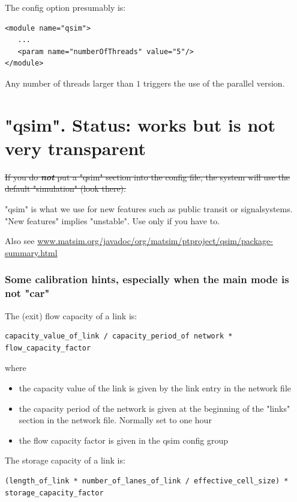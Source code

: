 The config option presumably is:
\begin{verbatim}
<module name="qsim">
   ...
   <param name="numberOfThreads" value="5"/>
</module>

\end{verbatim}

Any number of threads larger than $1$ triggers the use of the parallel version.

\vfill\eject
\section{"qsim". Status: works but is not very transparent}

\sout{If you do \textbf{\emph{not}} put a "qsim" section into the config file, the system will use the default "simulation" (look there).}

"qsim"  is what we use for new features such as public transit or  signalsystems. "New features" implies "unstable". Use only  if you have to.

Also see \href{http://www.matsim.org/javadoc/org/matsim/ptproject/qsim/package-summary.html}{www.matsim.org/javadoc/org/matsim/ptproject/qsim/package-summary.html}

\subsubsection{Some calibration hints, especially when the main mode is not "car"}

The (exit) flow capacity of a link is:
\begin{verbatim}
capacity_value_of_link / capacity_period_of network * flow_capacity_factor

\end{verbatim}

where
\begin{itemize}
	\item the capacity value of the link is given by the link entry in the network file
	\item the  capacity period of the network is given at the beginning of the "links"  section in the network file. Normally set to one hour
	\item the flow capacity factor is given in the qsim config group
\end{itemize}

The storage capacity of a link is:
\begin{verbatim}
(length_of_link * number_of_lanes_of_link / effective_cell_size) * storage_capacity_factor

\end{verbatim}

